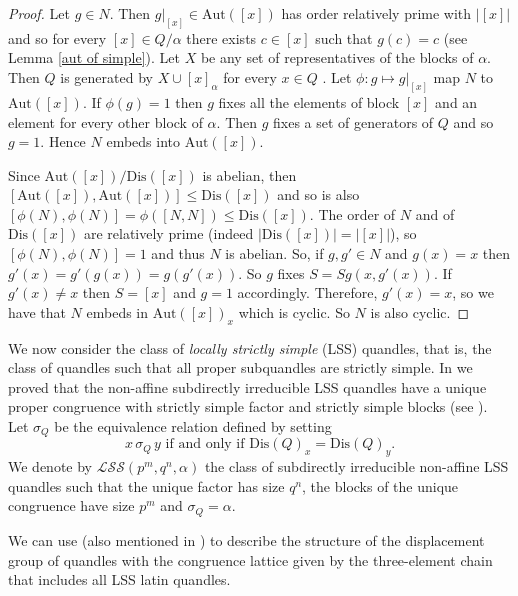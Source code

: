 \documentclass[a4paper, english, 9pt]{amsart}
\theoremstyle{plain}
\theoremstyle{definition}
\def\aut#1{\mathrm{Aut}(#1)}
\def\dis{\mathrm{Dis}}
\def\LSS{\mathcal{LSS}}
\begin{document}
\begin{proof}
 Let $g\in N$. Then $g|_{[x]}\in\aut{[x]}$ has order relatively prime with $|[x]|$ and so for every $[x]\in Q/\alpha$ there exists $c\in [x]$ such that $g(c)=c$ (see Lemma \ref{aut of simple}). Let $X$ be any set of representatives of the blocks of $\alpha$. Then $Q$ is generated by $X\cup [x]_\alpha$ for every $x\in Q$ \cite[Lemma 6.1]{GB}.
% 
 Let $\phi:g\mapsto g|_{[x]}$ map $N$ to $\aut{[x]}$. If $\phi(g)=1$ then $g$ fixes all the elements of block $[x]$ and an element for every other block of $\alpha$. Then $g$ fixes a set of generators of $Q$ and so $g=1$. Hence $N$ embeds into $\aut{[x]}$.

Since $\aut{[x]}/\dis([x])$ is abelian, then $[\aut{[x]},\aut{[x]}]\leq \dis([x])$ and so is also $[\phi(N),\phi(N)]=\phi([N,N])\leq \dis([x])$. The order of $N$ and of $\dis([x])$ are relatively prime (indeed $|\dis([x])|=|[x]|$), so $[\phi(N),\phi(N)]=1$ and thus $N$ is abelian. So, if $g,g'\in N$ and $g(x)=x$ then $g'(x)=g'(g(x))=g(g'(x))$. So $g$ fixes $S=Sg(x,g'(x))$. If $g'(x)\neq x$ then $S=[x]$ and $g=1$ accordingly. Therefore, $g'(x)=x$, so we have that $N$ embeds in $\aut{[x]}_x$ which is cyclic. So $N$ is also cyclic. 
\end{proof}

We now consider the class of {\it locally strictly simple} (LSS) quandles, that is, the class of quandles such that all proper subquandles are strictly simple. In \cite{LSS} we proved that the non-affine subdirectly irreducible LSS quandles have a unique proper congruence with strictly simple factor and strictly simple blocks (see \cite{LSS}). Let $\sigma_Q$ be the equivalence relation defined by setting
$$x\, \sigma_Q\, y \text{ if and only if }\dis(Q)_x=\dis(Q)_y.$$ 
We denote by $\LSS(p^m,q^n,\alpha)$ the class of subdirectly irreducible non-affine LSS quandles such that the unique factor has size $q^n$, the blocks of the unique congruence have size $p^m$ and $\sigma_Q=\alpha$.

We can use \cite[Proposition 5.7]{Principal} (also mentioned in \cite[Proposition. 3.11]{LSS}) to describe the structure of the displacement group of quandles with the congruence lattice given by the three-element chain that includes all LSS latin quandles. 
\end{document}
